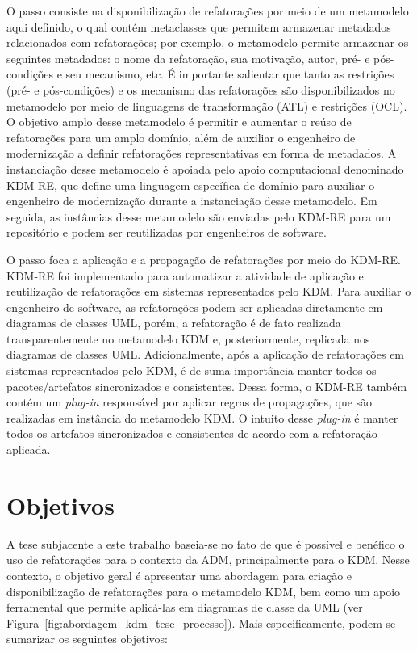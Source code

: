 O passo  consiste na disponibilização de refatorações por meio de um metamodelo aqui definido, o qual contém metaclasses que permitem armazenar metadados relacionados com refatorações; por exemplo, o metamodelo permite armazenar os seguintes metadados: o nome da refatoração, sua motivação, autor, pré- e pós-condições e seu mecanismo, etc. É importante salientar que tanto as restrições (pré- e pós-condições) e os mecanismo das refatorações são disponibilizados no metamodelo por meio de linguagens de transformação (ATL) e restrições (OCL). O objetivo amplo desse metamodelo é permitir e aumentar o reúso de refatorações para um amplo domínio, além de auxiliar o engenheiro de modernização a definir refatorações representativas em forma de metadados. A instanciação desse metamodelo é apoiada pelo apoio computacional denominado KDM-RE, que define uma linguagem específica de domínio para auxiliar o engenheiro de modernização durante a instanciação desse metamodelo. Em seguida, as instâncias desse metamodelo são enviadas pelo KDM-RE para um repositório e podem ser reutilizadas por engenheiros de software. 

O passo  foca a aplicação e a propagação de refatorações por meio do KDM-RE. KDM-RE foi implementado para automatizar a atividade de aplicação e reutilização de refatorações em sistemas representados pelo KDM. Para auxiliar o engenheiro de software, as refatorações podem ser aplicadas diretamente em diagramas de classes UML, porém, a refatoração é de fato realizada transparentemente no metamodelo KDM e, posteriormente, replicada nos diagramas de classes UML. Adicionalmente, após a aplicação de refatorações em sistemas representados pelo KDM, é de suma importância manter todos os pacotes/artefatos sincronizados e consistentes. Dessa forma, o KDM-RE também contém um \textit{plug-in} responsável por aplicar regras de propagações, que são realizadas em instância do metamodelo KDM. O intuito desse \textit{plug-in} é manter todos os artefatos sincronizados e consistentes de acordo com a refatoração aplicada.


\section{Objetivos}\label{sec:objetivos}

A tese subjacente a este trabalho baseia-se no fato de que é possível e benéfico o uso de refatorações para o contexto da ADM, principalmente para o KDM. Nesse contexto, o objetivo geral é apresentar uma abordagem para criação e disponibilização de refatorações para o metamodelo KDM, bem como um apoio ferramental que permite aplicá-las em diagramas de classe da UML (ver Figura~\ref{fig:abordagem_kdm_tese_processo}). Mais especificamente, podem-se sumarizar os seguintes objetivos:%

